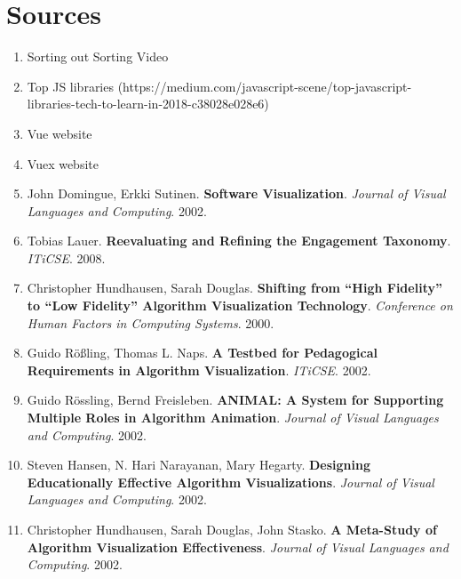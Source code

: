 \section{Sources}
\begin{enumerate}
	\item Sorting out Sorting Video \label{sorting-out-sorting}
	\item Top JS libraries 
	(https://medium.com/javascript-scene/top-javascript-libraries-tech-to-learn-in-2018-c38028e028e6)
	\label{top-js-libraries}
	\item Vue website \label{vue-website}
	\item Vuex website \label{vuex-website}
	\item \label{source-a} John Domingue, Erkki Sutinen. \textbf{Software Visualization}. \textit{Journal of Visual Languages and Computing}. 2002. 
	\item \label{source-b} Tobias Lauer. \textbf{Reevaluating and Refining the Engagement Taxonomy}. \textit{ITiCSE}. 2008. 
	\item \label{source-c} Christopher Hundhausen, Sarah Douglas. \textbf{Shifting from ``High Fidelity'' to ``Low Fidelity'' Algorithm Visualization Technology}. \textit{Conference on Human Factors in Computing Systems}. 2000. 
	\item \label{source-f} Guido Rößling, Thomas L. Naps. \textbf{A Testbed for Pedagogical Requirements in Algorithm Visualization}. \textit{ITiCSE}. 2002. 
	\item \label{source-h} Guido Rössling, Bernd Freisleben. \textbf{ANIMAL: A System for Supporting Multiple Roles in Algorithm Animation}. \textit{Journal of Visual Languages and Computing}. 2002. 
	\item \label{source-i} Steven Hansen, N. Hari Narayanan, Mary Hegarty. \textbf{Designing Educationally Effective Algorithm Visualizations}. \textit{Journal of Visual Languages and Computing}. 2002. 
	\item \label{source-j} Christopher Hundhausen, Sarah Douglas, John Stasko. \textbf{A Meta-Study of Algorithm Visualization Effectiveness}. \textit{Journal of Visual Languages and Computing}. 2002. 
\end{enumerate}
